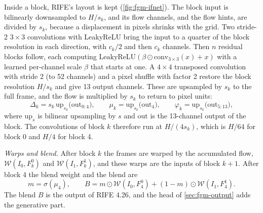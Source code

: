 Inside a block, RIFE's layout is kept (\cref{fig:fgm-ifnet}). The block input is bilinearly downsampled to $H/s_k$, and its flow channels, and the flow hints, are divided by $s_k$, because a displacement in pixels shrinks with the grid. Two stride-2 $3\times3$ convolutions with LeakyReLU bring the input to a quarter of the block resolution in each direction, with $c_k/2$ and then $c_k$ channels. Then $n$ residual blocks follow, each computing $\mathrm{LeakyReLU}(\beta\odot\mathrm{conv}_{3\times3}(x)+x)$ with a learned per-channel scale $\beta$ that starts at one. A $4\times4$ transposed convolution with stride 2 (to 52 channels) and a pixel shuffle with factor 2 \cite{shi2016espcn} restore the block resolution $H/s_k$ and give 13 output channels. These are upsampled by $s_k$ to the full frame, and the flow is multiplied by $s_k$ to return to pixel units:
\begin{equation}
\Delta_k=s_k\,\mathrm{up}_{s_k}\!\big(\mathrm{out}_{0:4}\big),\qquad \mu_k=\mathrm{up}_{s_k}\!\big(\mathrm{out}_{4}\big),\qquad \varphi_k=\mathrm{up}_{s_k}\!\big(\mathrm{out}_{5:13}\big),\label{eq:fgm-upflow}
\end{equation}
where $\mathrm{up}_{s}$ is bilinear upsampling by $s$ and $\mathrm{out}$ is the 13-channel output of the block. The convolutions of block $k$ therefore run at $H/(4s_k)$, which is $H/64$ for block 0 and $H/4$ for block 4.

\emph{Warps and blend.} After block $k$ the frames are warped by the accumulated flow, $\mathcal W(I_0,F_k^0)$ and $\mathcal W(I_1,F_k^1)$, and these warps are the inputs of block $k+1$. After block 4 the blend weight and the blend are
\begin{equation}
m=\sigma(\mu_4),\qquad B=m\odot\mathcal W(I_0,F_4^0)+(1-m)\odot\mathcal W(I_1,F_4^1).\label{eq:fgm-blend}
\end{equation}
The blend $B$ is the output of RIFE 4.26, and the head of \cref{sec:fgm-output} adds the generative part.

